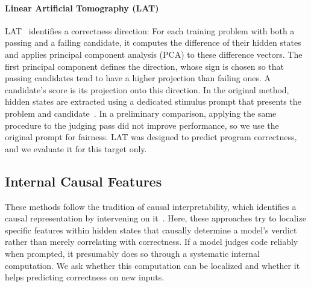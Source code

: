 \paragraph{Linear Artificial Tomography (LAT)}
LAT~\cite{ribeiro2026repe, Zou2023RepE} identifies a correctness direction:
For each training problem with both a passing and a failing candidate, it computes the difference
of their hidden states and applies principal component analysis (PCA) to these difference vectors. 
The first principal component defines the direction, whose sign is chosen so that passing candidates tend to have a higher projection than failing ones. 
A candidate's score is its projection onto this direction.
In the original method, hidden states are extracted using a dedicated stimulus prompt that presents the problem and candidate~\cite{ribeiro2026repe}. In a preliminary comparison, applying the same procedure to the judging pass did not improve performance, so we use the original prompt for fairness. LAT was designed to predict program correctness, and we evaluate it for this target only.


\subsection{Internal Causal Features}
\label{sec:methods-causal}
These methods follow the tradition of causal interpretability, which identifies a
causal representation by intervening on it~\cite{Geiger2021CausalAbstractions}. 
Here, these approaches try to localize specific features within hidden states that causally determine a model's verdict rather than merely correlating with correctness. If a model judges code reliably when prompted, it presumably does so through a systematic internal
computation. 
We ask whether this computation can be localized 
and whether it helps predicting correctness on new inputs.

